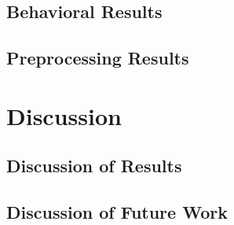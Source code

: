 \documentclass[11pt]{article}
\begin{document}
    \subsection{Behavioral Results}
                
    \subsection{Preprocessing Results}
                
\section{Discussion}

    \subsection{Discussion of Results}
            

    \subsection{Discussion of Future Work}
            


\end{document}

